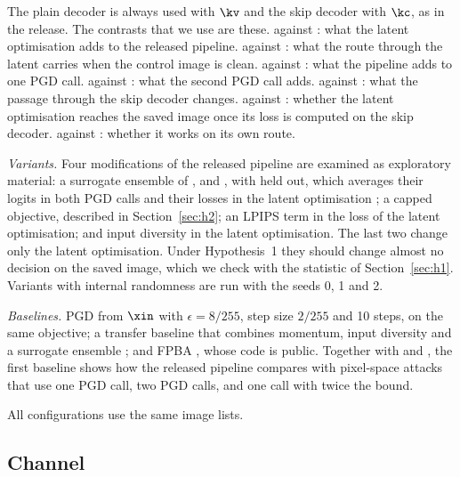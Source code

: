 The plain decoder is always used with $\kv$ and the skip decoder with $\kc$, as in the release.
The contrasts that we use are these.  against : what the latent optimisation adds
to the released pipeline.  against : what the route through the latent carries when
the control image is clean.  against : what the pipeline adds to one PGD call.
 against : what the second PGD call adds.  against : what the
passage through the skip decoder changes.  against : whether the latent
optimisation reaches the saved image once its loss is computed on the skip decoder. 
against : whether it works on its own route.

\emph{Variants.} Four modifications of the released pipeline are examined as exploratory material:
a surrogate ensemble of \detE, \detR and \detD, with \detS held out, which averages their logits in
both PGD calls and their losses in the latent optimisation ; a capped
objective, described in Section~\ref{sec:h2}; an LPIPS term in the loss of the latent
optimisation; and input diversity  in the latent optimisation.
 The last two change only the latent optimisation. Under Hypothesis~1 they should
change almost no decision on the saved image, which we check with the statistic of
Section~\ref{sec:h1}. Variants with internal randomness are run with the seeds 0, 1 and 2.

\emph{Baselines.} PGD from $\xin$ with $\epsilon=8/255$, step size $2/255$ and 10 steps, on the same
objective; a transfer baseline that combines momentum, input diversity and a surrogate ensemble
 ; and FPBA
, whose code is public.  Together with  and , the first baseline shows how the
released pipeline compares with pixel-space attacks that use one PGD call, two PGD calls, and one
call with twice the bound.

All configurations use the same image lists.

\subsection{Channel}
\label{sec:channel}

